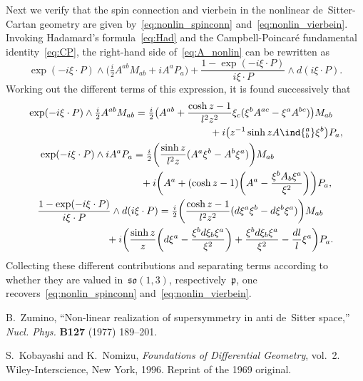 \documentclass[11pt]{article}
\begin{document}
Next we verify that the spin connection and vierbein in the 
nonlinear de~Sitter-Cartan geometry are given 
by~\eqref{eq:nonlin_spinconn} and~\eqref{eq:nonlin_vierbein}.  
Invoking Hadamard's formula~\eqref{eq:Had} and the 
Campbell-Poincar\'e fundamental identity~\eqref{eq:CP}, the 
right-hand side of~\eqref{eq:A_nonlin} can be rewritten as
\begin{displaymath}
	\exp(-i\xi\cdot P) \wedge \big( \tfrac{i}{2} A^{ab} M_{ab} + i 
	A^a P_a \big) + \frac{1 - \exp(-i\xi\cdot P)}{i\xi\cdot P} 
	\wedge d (i\xi\cdot P).
\end{displaymath}
Working out the different terms of this expression, it is found 
successively that
\begin{gather*}
\begin{multlined}[b][0.85\linewidth]
	\exp(-i\xi\cdot P) \wedge \tfrac{i}{2} A^{ab} M_{ab}
	= \tfrac{i}{2} \big( A^{ab} + \frac{\cosh z - 1}{l^2 z^2} 
	\xi_c ( \xi^b A^{ac} - \xi^a A^{bc} ) \big) M_{ab} \\
	+ i \big( z^{-1} \sinh z A\ind{^a_b} \xi^b \big) P_a,
\end{multlined}
\\
\begin{multlined}[b][0.85\linewidth]
	\exp(-i\xi\cdot P) \wedge i A^a P_a = \tfrac{i}{2} \bigg( 
	\frac{\sinh z}{l^2 z} (A^a \xi^b - A^b \xi^a ) \bigg) M_{ab} 
	\\
	+ i \bigg( A^a + (\cosh z - 1) \bigg(A^a - \frac{\xi^b A_b 
		\xi^a}{\xi^2}  \bigg) \bigg) P_a,
\end{multlined}
\\
\begin{multlined}[b][0.85\linewidth]
	\frac{1 - \exp(-i\xi\cdot P)}{i\xi\cdot P} \wedge d (i\xi\cdot 
	P) = \tfrac{i}{2} \bigg( \frac{\cosh z - 1}{l^2 z^2} (d\xi^a 
	\xi^b - d\xi^b \xi^a) \bigg) M_{ab} \\
	+ i \bigg( \frac{\sinh z}{z} \bigg( d\xi^a - \frac{\xi^b 
		d\xi_b \xi^a}{\xi^2} \bigg) + \frac{\xi^b d\xi_b 
		\xi^a}{\xi^2} - \frac{dl}{l} \xi^a \bigg) P_a.
\end{multlined}
\end{gather*}
Collecting these different contributions and separating terms 
according to whether they are valued in~$\mathfrak{so}(1,3)$, 
respectively~$\mathfrak{p}$, one 
recovers~\eqref{eq:nonlin_spinconn}
and~\eqref{eq:nonlin_vierbein}.


\providecommand{\href}[2]{#2}
\begingroup\raggedright
\begin{thebibliography}{1}

B.~Zumino, ``Non-linear realization of supersymmetry in anti de~{S}itter
  space,'' \href{http://dx.doi.org/10.1016/0550-3213(77)90211-5}{{\em Nucl.
  Phys.} {\bfseries B127} (1977) 189--201}.

S.~Kobayashi and K.~Nomizu, {\em Foundations of Differential Geometry}, vol.~2.
\newblock Wiley-Interscience, New York, 1996.
\newblock Reprint of the 1969 original.

\end{thebibliography}
\endgroup
\end{document}
